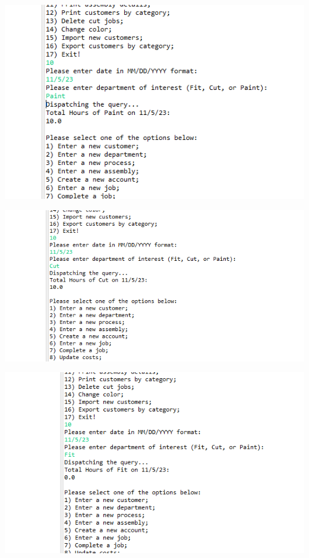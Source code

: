 \documentclass[11pt]{article}
\begin{document}
\includegraphics[width = \textwidth]{Hours2.png}

\includegraphics[width = \textwidth]{Hours3.png}

\includegraphics[width = \textwidth]{Hours4.png}
\end{document}
